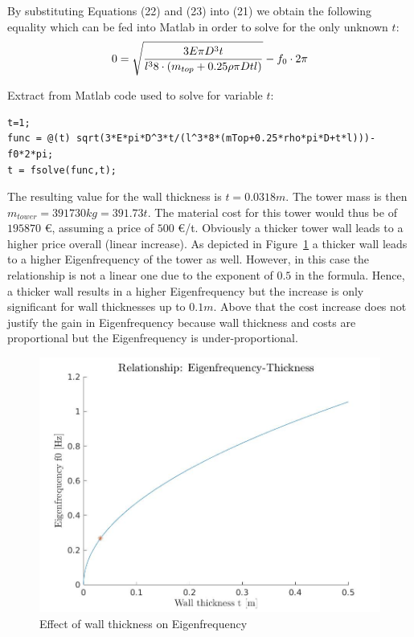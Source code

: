 \documentclass[10pt]{article}
\begin{document}
By substituting Equations (22) and (23) into (21) we obtain the following equality which can be fed into Matlab in order to solve for the only unknown $t$:\\

\begin{equation*}
0 = \sqrt{\frac{3 E \pi D^3 t}{l^3 8 \cdot (m_{top} + 0.25\rho \pi D t l)}} -f_0 \cdot 2 \pi \\
\end{equation*}

Extract from Matlab code used to solve for variable $t$:\\

\begin{lstlisting}
t=1;
func = @(t) sqrt(3*E*pi*D^3*t/(l^3*8*(mTop+0.25*rho*pi*D+t*l)))-f0*2*pi;
t = fsolve(func,t);
\end{lstlisting}

The resulting value for the wall thickness is $t=0.0318m$. The tower mass is then $m_{tower}=391730 kg = 391.73t$. The material cost for this tower would thus be of $195870$ \euro, assuming a price of $500$ \euro /t. Obviously a thicker tower wall leads to a higher price overall (linear increase). As depicted in Figure~\ref{fig:eigfreqWall} a thicker wall leads to a higher Eigenfrequency of the tower as well. However, in this case the relationship is not a linear one due to the exponent of $0.5$ in the formula. Hence, a thicker wall results in a higher Eigenfrequency but the increase is only significant for wall thicknesses up to $0.1m$. Above that the cost increase does not justify the gain in Eigenfrequency because wall thickness and costs are proportional but the Eigenfrequency is under-proportional.

\begin{figure}[H]
\centering
\includegraphics[width=\linewidth]{../CIP_4/figures/eigenfrequency.jpg}
\caption{Effect of wall thickness on Eigenfrequency}
\label{fig:eigfreqWall}
\end{figure} 
\end{document}
